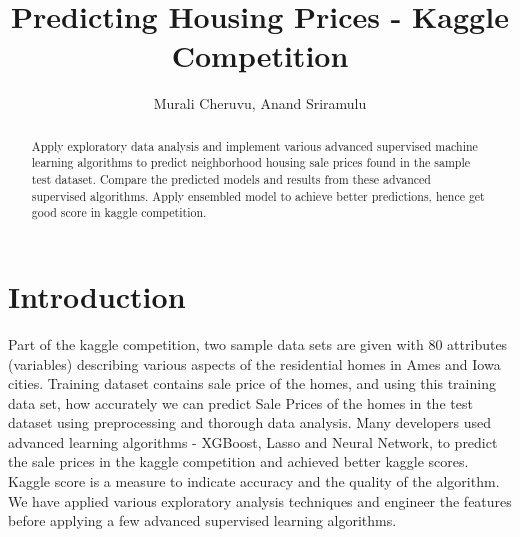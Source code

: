 \documentclass[sigconf]{acmart}
\begin{document}
	
	\title{Predicting Housing Prices - Kaggle Competition}	
	
	\author{Murali Cheruvu, Anand Sriramulu}
	
	\renewcommand{\shortauthors}{M. Cheruvu, A Sriramulu}
	
	
	\begin{abstract}
		
		Apply exploratory data analysis and implement various advanced supervised machine learning algorithms to predict neighborhood housing sale prices found in the sample test dataset. Compare the predicted models and results from these advanced supervised algorithms. Apply ensembled model to achieve better predictions, hence get good score in kaggle competition.
		
	\end{abstract}
	
	
	\maketitle
	
	\section{Introduction} %
	
	Part of the kaggle competition, two sample data sets are given with 80 attributes (variables) describing various aspects of the residential homes in Ames and Iowa cities. Training dataset contains sale price of the homes, and using this training data set, how accurately we can predict Sale Prices of the homes in the test dataset using preprocessing and thorough data analysis. Many developers used advanced learning algorithms - XGBoost, Lasso and Neural Network, to predict the sale prices in the kaggle competition and achieved better kaggle scores. Kaggle score is a measure to indicate accuracy and the quality of the algorithm. We have applied various exploratory analysis techniques and engineer the features before applying a few advanced supervised learning algorithms.   
	
\end{document}
